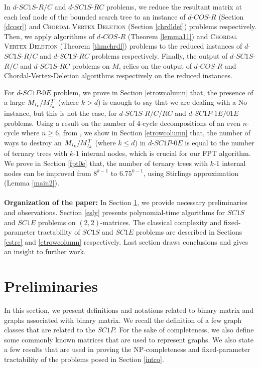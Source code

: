 \documentclass[review, 1p]{elsarticle}
\begin{document}
In $d$-$SC1S$-$R/C$ and $d$-$SC1S$-$RC$ problems, we reduce the resultant matrix at each leaf node of the bounded search tree to an instance of $d$-$COS$-$R$ (Section \ref{dcosr}) and \textsc{Chordal Vertex Deletion} (Section \ref{chrdldef}) problems respectively. Then, we apply algorithms of \textit{$d$-$COS$-$R$} (Theorem \ref{lemma11}) and \textsc{Chordal Vertex Deletion} (Theorem \ref{thmchrdl}) problems to the reduced instances of $d$-$SC1S$-$R/C$ and $d$-$SC1S$-$RC$ problems respectively. Finally, the output of $d$-$SC1S$-$R/C$ and $d$-$SC1S$-$RC$ problems on $M$, relies on the output of $d$-$COS$-$R$ and Chordal-Vertex-Deletion algorithms respectively on the reduced instances. 

For $d$-$SC1P$-$0E$ problem, we prove in Section \ref{etrowcolumn} that, the presence of a large $M_{\mathsmaller{I_{k}}}/ M^{T}_{\mathsmaller{I_{k}}}$ (where $k > d$) is enough to say that we are dealing with a No instance, but this is not the case, for $d$-$SC1S$-$R/C/RC$ and $d$-$SC1P$-$1E/01E$ problems. Using a result on the number of $4$-cycle decompositions of an even $n$-cycle where $n \geq 6$, from \cite{kaplan1999tractability}, we show in Section \ref{etrowcolumn} that, the number of ways to destroy an $M_{\mathsmaller{I_{k}}}/ M^{T}_{\mathsmaller{I_{k}}}$ (where $k \leq d$) in $d$-$SC1P$-$0E$ is equal to the number of ternary trees with $k$-$1$ internal nodes, which is crucial for our FPT algorithm. We prove in Section \ref{fpt0e} that, the number of ternary trees with $k$-$1$ internal nodes can be improved from $8^{k-1}$ to $6.75^{k-1}$, using Stirlings approximation (Lemma \ref{main2}). \\\\
\noindent \textbf{Organization of the paper: }In Section \ref{prel}, we provide necessary preliminaries and observations. Section \ref{esly} presents polynomial-time algorithms for $SC1S$ and $SC1E$ problems on $(2,2)$-matrices. The classical complexity and fixed-parameter tractability of $SC1S$ and $SC1E$ problems are described in Sections  \ref{estrc} and \ref{etrowcolumn} respectively. Last section draws conclusions and gives an insight to further work.
\section{Preliminaries}\label{prel}
In this section, we present definitions and notations related to binary matrix and graphs associated with binary matrix. We recall the definition of a few graph classes that are related to the $SC1P$. For the sake of completeness, we also define some commonly known matrices that are used to represent graphs. We also state a few results that are used in proving the NP-completeness and fixed-parameter tractability of the problems posed in Section \ref{intro}.
\end{document}
